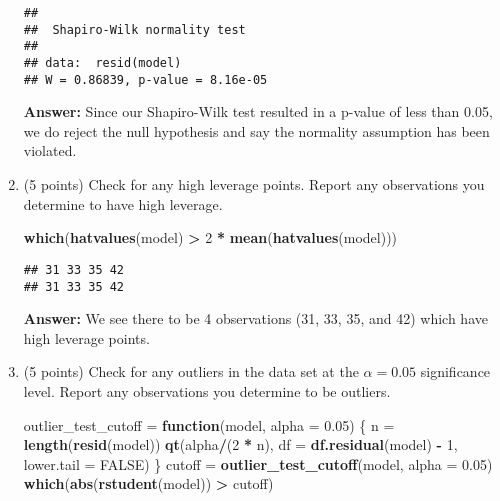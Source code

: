 \documentclass[
]{article}
\newenvironment{Shaded}{\begin{snugshade}}{\end{snugshade}}
\newcommand{\AttributeTok}[1]{\textcolor[rgb]{0.13,0.29,0.53}{#1}}
\newcommand{\ConstantTok}[1]{\textcolor[rgb]{0.56,0.35,0.01}{#1}}
\newcommand{\ControlFlowTok}[1]{\textcolor[rgb]{0.13,0.29,0.53}{\textbf{#1}}}
\newcommand{\DecValTok}[1]{\textcolor[rgb]{0.00,0.00,0.81}{#1}}
\newcommand{\FloatTok}[1]{\textcolor[rgb]{0.00,0.00,0.81}{#1}}
\newcommand{\FunctionTok}[1]{\textcolor[rgb]{0.13,0.29,0.53}{\textbf{#1}}}
\newcommand{\NormalTok}[1]{#1}
\newcommand{\OtherTok}[1]{\textcolor[rgb]{0.56,0.35,0.01}{#1}}
\newcommand{\SpecialCharTok}[1]{\textcolor[rgb]{0.81,0.36,0.00}{\textbf{#1}}}
\begin{document}
\begin{enumerate}
\begin{verbatim}
## 
##  Shapiro-Wilk normality test
## 
## data:  resid(model)
## W = 0.86839, p-value = 8.16e-05
\end{verbatim}

  \textbf{Answer:} Since our Shapiro-Wilk test resulted in a p-value of
  less than 0.05, we do reject the null hypothesis and say the normality
  assumption has been violated.
\item
  (5 points) Check for any high leverage points. Report any observations
  you determine to have high leverage.

\begin{Shaded}
\begin{Highlighting}[]
\FunctionTok{which}\NormalTok{(}\FunctionTok{hatvalues}\NormalTok{(model) }\SpecialCharTok{\textgreater{}} \DecValTok{2} \SpecialCharTok{*} \FunctionTok{mean}\NormalTok{(}\FunctionTok{hatvalues}\NormalTok{(model)))}
\end{Highlighting}
\end{Shaded}

\begin{verbatim}
## 31 33 35 42 
## 31 33 35 42
\end{verbatim}

  \textbf{Answer:} We see there to be 4 observations (31, 33, 35, and
  42) which have high leverage points.
\item
  (5 points) Check for any outliers in the data set at the
  \(\alpha = 0.05\) significance level. Report any observations you
  determine to be outliers.

\begin{Shaded}
\begin{Highlighting}[]
\NormalTok{outlier\_test\_cutoff }\OtherTok{=} \ControlFlowTok{function}\NormalTok{(model, }\AttributeTok{alpha =} \FloatTok{0.05}\NormalTok{) \{}
\NormalTok{    n }\OtherTok{=} \FunctionTok{length}\NormalTok{(}\FunctionTok{resid}\NormalTok{(model))}
    \FunctionTok{qt}\NormalTok{(alpha}\SpecialCharTok{/}\NormalTok{(}\DecValTok{2} \SpecialCharTok{*}\NormalTok{ n), }\AttributeTok{df =} \FunctionTok{df.residual}\NormalTok{(model) }\SpecialCharTok{{-}} \DecValTok{1}\NormalTok{, }\AttributeTok{lower.tail =} \ConstantTok{FALSE}\NormalTok{)}
\NormalTok{\}}
\NormalTok{cutoff }\OtherTok{=} \FunctionTok{outlier\_test\_cutoff}\NormalTok{(model, }\AttributeTok{alpha =} \FloatTok{0.05}\NormalTok{)}
\FunctionTok{which}\NormalTok{(}\FunctionTok{abs}\NormalTok{(}\FunctionTok{rstudent}\NormalTok{(model)) }\SpecialCharTok{\textgreater{}}\NormalTok{ cutoff)}
\end{Highlighting}
\end{Shaded}


\end{enumerate}
\end{document}
